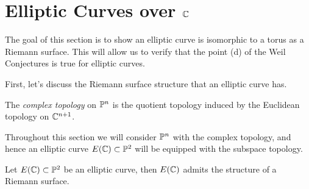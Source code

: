 \section{Elliptic Curves over \texorpdfstring{$\mathbb{C}$}{C}}
\label{sec:over-C}

The goal of this section is to show an elliptic curve is
isomorphic to a torus as a Riemann surface. This will allow us to
verify that the point (d) of the Weil Conjectures is true for elliptic curves.

First, let's discuss the Riemann surface structure that an elliptic curve has.

\begin{definition}
	The \emph{complex topology} on $\mathbb{P}^n$ is the quotient topology induced
	by the Euclidean topology on $\mathbb{C}^{n+1}$.
\end{definition}

Throughout this section we will consider $\mathbb{P}^n$ with the complex topology,
and hence an elliptic curve $E(\mathbb{C}) \subset \mathbb{P}^2$ will be equipped with
the subspace topology.

\begin{proposition}
	\label{prop:riemann-surf-struct}
	Let $E(\mathbb{C}) \subset \mathbb{P}^2$ be an elliptic curve, then $E(\mathbb{C})$ admits
	the structure of a Riemann surface.
\end{proposition}

